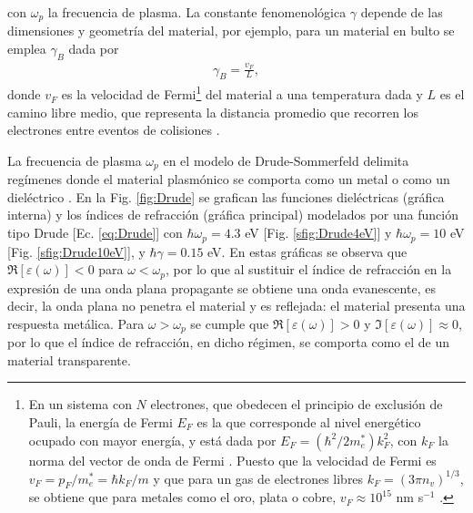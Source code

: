 %
	\begin{tcolorbox}[title = Modelo de Drude-Sommerfeld, breakable ]
	\end{tcolorbox}\vspace*{-.75em}\noindent
%
con $\omega_p$ la frecuencia de plasma. La constante fenomenológica $\gamma$ depende de las dimensiones y geometría del material, por ejemplo, para un material en bulto se emplea  $\gamma_B$ dada por \cite{kreibig1995clusters} 
%
	\begin{align}
	\gamma_B = \frac{v_F}{L},
			 \label{eq:gammaInf}	
	\end{align}
%
donde $v_F$ es la velocidad de Fermi\footnote{En un sistema con $N$ electrones, que obedecen el principio  de exclusión de Pauli, la energía de Fermi $E_F$ es la que corresponde al nivel energético ocupado con mayor energía, y está dada por $E_F = (\hbar^2/2m_e^*)k_F^2$, con $k_F$ la norma del vector de onda de Fermi \cite{gross2014festkorperphysik}.  Puesto que la velocidad de Fermi es $v_F = p_F/m_e^* = \hbar k_F / m$ y que para un gas de electrones libres $k_F=(3\pi n_v)^{1/3}$, se obtiene que para metales como el oro, plata o cobre,  $v_F\approx 10^{15}$ nm s$^{-1}$ \cite{gross2014festkorperphysik,ashcroft1976solid}. } del material a una temperatura dada y $L$ es el camino libre medio, que representa la distancia promedio que recorren los electrones entre eventos de colisiones \cite{gross2014festkorperphysik}.  

La frecuencia de plasma $\omega_p$ en el modelo de Drude-Sommerfeld delimita regímenes donde el material plasmónico se comporta como un metal o como un dieléctrico \cite{trugler2011properties}.  En la Fig.  \ref{fig:Drude} se grafican las funciones dieléctricas (gráfica interna) y los índices de refracción  (gráfica principal) modelados por una función tipo Drude [Ec. \eqref{eq:Drude}] con $\hbar\omega_p=4. 3$ eV [Fig.  \ref{sfig:Drude4eV}] y $\hbar\omega_p=10$ eV [Fig.  \ref{sfig:Drude10eV}], y $\hbar\gamma=0. 15$ eV.  En estas gráficas se observa que $\Re[\varepsilon(\omega)]<0$ para $\omega<\omega_p$, por lo que al sustituir el índice de refracción en la expresión de una onda plana propagante se obtiene una onda evanescente, es decir, la onda plana no penetra el material y es reflejada: el material presenta una respuesta metálica.  Para $\omega>\omega_p$ se cumple que $\Re[\varepsilon(\omega)]>0$ y $\Im[\varepsilon(\omega)]\approx 0$, por lo que el índice de refracción, en dicho régimen, se comporta como el de un  material transparente. 

